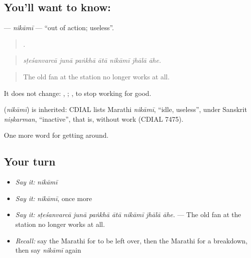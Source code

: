 \subsection*{You'll want to know: }
\textbf{} — \emph{nikāmī} — \textquotedblleft{}out of action; useless\textquotedblright{}.

\begin{quote}
      .
\end{quote}

\begin{quote}
\emph{sṭeśanvarcā junā paṅkhā ātā nikāmī jhālā āhe.}
\end{quote}

\begin{quote}
The old fan at the station no longer works at all.
\end{quote}

It does not change:  ,  ;  , to stop working for good.

\begin{cousinweb}
\textbf{} (\emph{nikāmī}) is inherited: CDIAL lists Marathi \emph{nikāmī}, \textquotedblleft{}idle, useless\textquotedblright{}, under Sanskrit \emph{niṣkarman}, \textquotedblleft{}inactive\textquotedblright{}, that is, without work (CDIAL 7475).
\end{cousinweb}

\begin{grammarlens}[title={What you've built}]
One more word for getting around.
\end{grammarlens}

\subsection*{Your turn}
\begin{itemize}
\raggedright
  \item \emph{Say it:} \emph{nikāmī}
  \item \emph{Say it:} \emph{nikāmī}, once more
  \item \emph{Say it:} \emph{sṭeśanvarcā junā paṅkhā ātā nikāmī jhālā āhe.} — The old fan at the station no longer works at all.
  \item \emph{Recall:} say the Marathi for to be left over, then the Marathi for a breakdown, then say \emph{nikāmī} again
\end{itemize}

